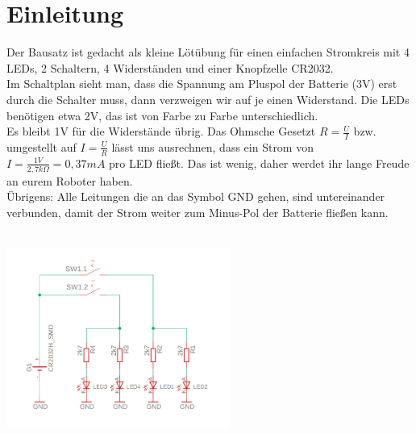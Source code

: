 \documentclass[a4paper]{article}
\begin{document}
\section{Einleitung}
Der Bausatz ist gedacht als kleine Lötübung für einen einfachen Stromkreis mit  4 LEDs, 2 Schaltern, 4 Widerständen und einer Knopfzelle CR2032.\\
Im Schaltplan sieht man, dass die Spannung am Pluspol der Batterie (3V) erst durch die Schalter muss, dann verzweigen wir auf je einen Widerstand. Die LEDs benötigen etwa 2V, das ist von Farbe zu Farbe unterschiedlich.\\ Es bleibt 1V für die Widerstände übrig. Das Ohmsche Gesetzt $R = \frac{U}{I}$ bzw. umgestellt auf $I = \frac{U}{R}$ lässt uns ausrechnen, dass ein Strom von $I = \frac{1V}{2,7 k\Omega} = 0,37 mA$ pro LED fließt. Das ist wenig, daher werdet ihr lange Freude an eurem Roboter haben.\\
Übrigens: Alle Leitungen die an das Symbol GND gehen, sind untereinander verbunden, damit der Strom weiter zum Minus-Pol der Batterie fließen kann.\\
\ \\
\begin{minipage}[t]{\textwidth}
  \centering
  \includegraphics[width=0.55\textwidth]{../pictures/Schematic}
  \label{img:Schematic}
\end{minipage}
\newpage
\end{document}
